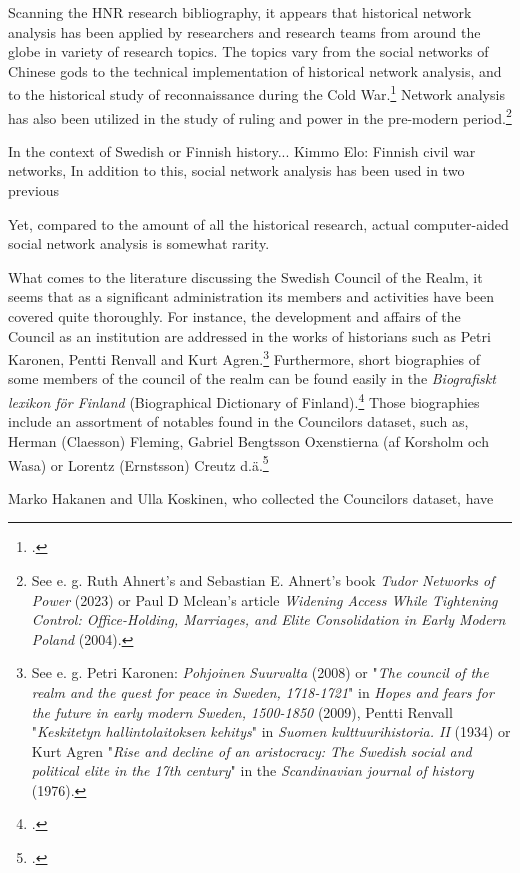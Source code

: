 \documentclass[a4paper,12pt]{article}
\begin{document}
Scanning the HNR research bibliography, it appears that historical network analysis has been applied by researchers and research teams from around the globe in variety of research topics. The topics vary from the social networks of Chinese gods to the technical implementation of historical network analysis, and to the historical study of reconnaissance during the Cold War.\footcites[p. 22.]{elo16}{hnrbib} Network analysis has also been utilized in the study of ruling and power in the pre-modern period.\footnote{See e. g. Ruth Ahnert's and Sebastian E. Ahnert's book \textit{Tudor Networks of Power} (2023) or Paul D Mclean's article \textit{Widening Access While Tightening Control: Office-Holding, Marriages, and Elite Consolidation in Early Modern Poland} (2004).}

In the context of Swedish or Finnish history... Kimmo Elo: Finnish civil war networks, 
In addition to this, social network analysis has been used in two previous 

Yet, compared to the amount of all the historical research, actual computer-aided social network analysis is somewhat rarity.

What comes to the literature discussing the Swedish Council of the Realm, it seems that as a significant administration its members and activities have been covered quite thoroughly. For instance, the development and affairs of the Council as an institution are addressed in the works of historians such as Petri Karonen, Pentti Renvall and Kurt Agren.\footnote{See e. g. Petri Karonen: \textit{Pohjoinen Suurvalta} (2008) or "\textit{The council of the realm and the quest for peace in Sweden, 1718-1721}" in \textit{Hopes and fears for the future in early modern Sweden, 1500-1850} (2009), Pentti Renvall "\textit{Keskitetyn hallintolaitoksen kehitys}" in \textit{Suomen kulttuurihistoria. II} (1934) or Kurt Agren "\textit{Rise and decline of an aristocracy: The Swedish social and political elite in the 17th century}" in the \textit{Scandinavian journal of history} (1976).} Furthermore, short biographies of some members of the council of the realm can be found easily in the \textit{Biografiskt lexikon för Finland} (Biographical Dictionary of Finland).\footcite{blf} Those biographies include an assortment of notables found in the Councilors dataset, such as, Herman (Claesson) Fleming, Gabriel Bengtsson Oxenstierna (af Korsholm och Wasa) or Lorentz (Ernstsson) Creutz d.ä.\footcite{blf-list}


 Marko Hakanen and Ulla Koskinen, who collected the Councilors dataset, have 
 
\end{document}
